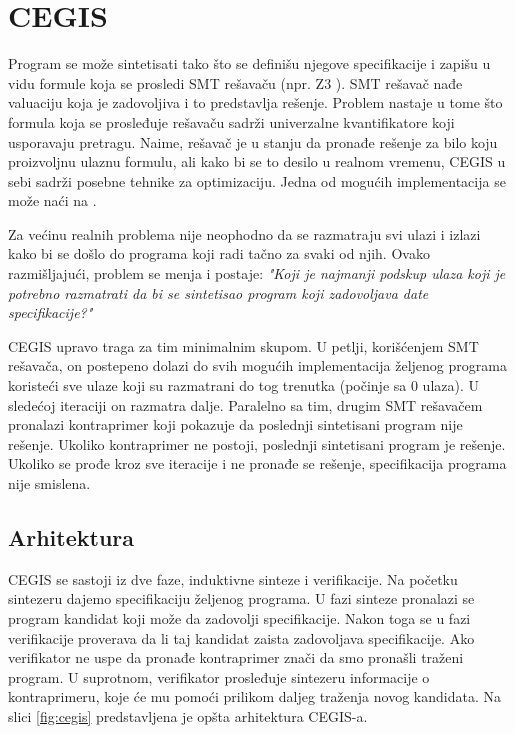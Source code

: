 \section{CEGIS}
\label{sec:cegis}

Program se može sintetisati tako što se definišu njegove specifikacije i zapišu u vidu formule koja se prosledi SMT rešavaču (npr. Z3 \cite{Z3}). SMT rešavač nađe valuaciju koja je zadovoljiva i to predstavlja rešenje. Problem nastaje u tome što formula koja se prosleđuje rešavaču sadrži univerzalne kvantifikatore koji usporavaju pretragu. Naime, rešavač je u stanju da pronađe rešenje za bilo koju proizvoljnu ulaznu formulu, ali kako bi se to desilo u realnom vremenu, CEGIS u sebi sadrži posebne tehnike za optimizaciju. Jedna od mogućih implementacija se može naći na \cite{CEGISimpl}.

Za većinu realnih problema nije neophodno da se razmatraju svi ulazi i izlazi kako bi se došlo do programa koji radi tačno za svaki od njih. Ovako razmišljajući, problem se menja i postaje: \emph{"Koji je najmanji podskup ulaza koji je potrebno razmatrati da bi se sintetisao program koji zadovoljava date specifikacije?"}

CEGIS upravo traga za tim minimalnim skupom. U petlji, korišćenjem SMT rešavača, on postepeno dolazi do svih mogućih implementacija že\-lje\-nog programa koristeći sve ulaze koji su razmatrani do tog trenutka (počinje sa 0 ulaza). U sledećoj iteraciji on razmatra dalje. Paralelno sa tim, drugim SMT rešavačem pronalazi kontraprimer koji pokazuje da poslednji sintetisani program nije rešenje. Ukoliko kontraprimer ne postoji, poslednji sintetisani program je rešenje. Ukoliko se prođe kroz sve iteracije i ne pronađe se rešenje, specifikacija programa nije smislena.


\subsection{Arhitektura}
\label{subsec:Arhitektura}

CEGIS se sastoji iz dve faze, induktivne sinteze i verifikacije. Na početku sintezeru dajemo specifikaciju željenog programa. U fazi sinteze pronalazi se program kandidat koji može da zadovolji specifikacije. Nakon toga se u fazi verifikacije proverava da li taj kandidat zaista zadovoljava specifikacije. Ako verifikator ne uspe da pronađe kontraprimer znači da smo pronašli traženi program. U suprotnom, verifikator prosleđuje sintezeru informacije o kontraprimeru, koje će mu pomoći prilikom daljeg traženja novog kandidata. Na slici \ref{fig:cegis} predstavljena je opšta arhitektura CEGIS-a.


